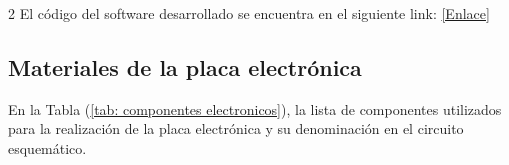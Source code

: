 \documentclass[11pt,letterpaper]{article}
\begin{document}
\begin{multicols*}{2}
El código del software desarrollado se encuentra en el siguiente link: \href{https://github.com/santiagopradorodriguez/Nandu_SistemadeAdqusicionEMG}{[Enlace]}
\subsection*{Materiales de la placa electrónica}
\label{apendice: materiales placa}

En la Tabla (\ref{tab: componentes electronicos}), la lista de componentes utilizados para la realización de la placa electrónica y su denominación en el circuito esquemático.



\end{multicols*}
\end{document}
